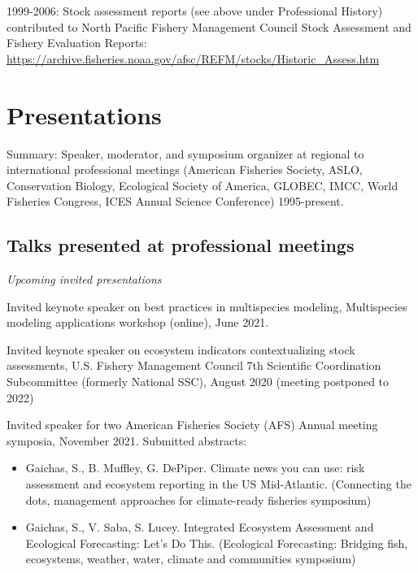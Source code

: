 \documentclass[11pt, a4paper]{awesome-cv}
\begin{document}
1999-2006: Stock assessment reports (see above under Professional
History) contributed to North Pacific Fishery Management Council Stock
Assessment and Fishery Evaluation Reports:
\url{https://archive.fisheries.noaa.gov/afsc/REFM/stocks/Historic_Assess.htm}

\hypertarget{presentations}{%
\section{Presentations}\label{presentations}}

Summary: Speaker, moderator, and symposium organizer at regional to
international professional meetings (American Fisheries Society, ASLO,
Conservation Biology, Ecological Society of America, GLOBEC, IMCC, World
Fisheries Congress, ICES Annual Science Conference) 1995-present.

\hypertarget{talks-presented-at-professional-meetings}{%
\subsection{Talks presented at professional
meetings}\label{talks-presented-at-professional-meetings}}

\emph{Upcoming invited presentations}

Invited keynote speaker on best practices in multispecies modeling,
Multispecies modeling applications workshop (online), June 2021.

Invited keynote speaker on ecosystem indicators contextualizing stock
assessments, U.S. Fishery Management Council 7th Scientific Coordination
Subcommittee (formerly National SSC), August 2020 (meeting postponed to
2022)

Invited speaker for two American Fisheries Society (AFS) Annual meeting
symposia, November 2021. Submitted abstracts:

\begin{itemize}
\item
  Gaichas, S., B. Muffley, G. DePiper. Climate news you can use: risk
  assessment and ecosystem reporting in the US Mid-Atlantic. (Connecting
  the dots, management approaches for climate-ready fisheries symposium)
\item
  Gaichas, S., V. Saba, S. Lucey. Integrated Ecosystem Assessment and
  Ecological Forecasting: Let's Do This. (Ecological Forecasting:
  Bridging fish, ecosystems, weather, water, climate and communities
  symposium)
\end{itemize}
\end{document}
